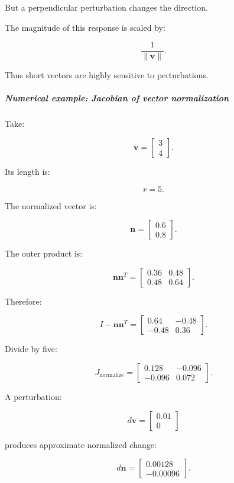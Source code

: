 But a perpendicular perturbation changes the direction.

The magnitude of this response is scaled by:

\[
\frac1{\|\mathbf v\|}.
\]

Thus short vectors are highly sensitive to perturbations.

\subparagraph{Numerical example: Jacobian of vector normalization}\label{numerical-example-jacobian-of-vector-normalization}

Take:

\[
\mathbf v= \begin{bmatrix} 3\\4 \end{bmatrix}.
\]

Its length is:

\[
r=5.
\]

The normalized vector is:

\[
\mathbf n= \begin{bmatrix} 0.6\\0.8 \end{bmatrix}.
\]

The outer product is:

\[
\mathbf n\mathbf n^T= \begin{bmatrix} 0.36&0.48\\ 0.48&0.64 \end{bmatrix}.
\]

Therefore:

\[
I-\mathbf n\mathbf n^T= \begin{bmatrix} 0.64&-0.48\\ -0.48&0.36 \end{bmatrix}.
\]

Divide by five:

\[
\boxed{ J_{\mathrm{normalize}}= \begin{bmatrix} 0.128&-0.096\\ -0.096&0.072 \end{bmatrix} }.
\]

A perturbation:

\[
d\mathbf v= \begin{bmatrix} 0.01\\0 \end{bmatrix}
\]

produces approximate normalized change:

\[
d\mathbf n = \begin{bmatrix} 0.00128\\-0.00096 \end{bmatrix}.
\]

